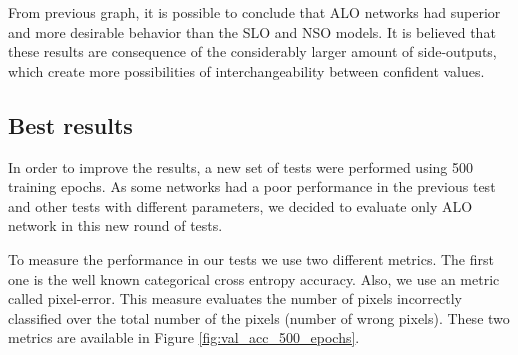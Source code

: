 From previous graph, it is possible to conclude that ALO networks had superior and more desirable behavior than the SLO and NSO models. It is believed that these results are consequence of the considerably larger amount of side-outputs, which create more possibilities of interchangeability between confident values.

\subsection{Best results}

In order to improve the results, a new set of tests were performed using 500 training epochs. As some networks had a poor performance in the previous test and other tests with different parameters, we decided to evaluate only ALO network in this new round of tests. 

To measure the performance in our tests we use two different metrics. The first one is the well known categorical cross entropy accuracy. Also, we use an metric called pixel-error. This measure evaluates the number of pixels incorrectly classified over the total number of the pixels (number of wrong pixels). These two metrics are available in Figure \ref{fig:val_acc_500_epochs}.

